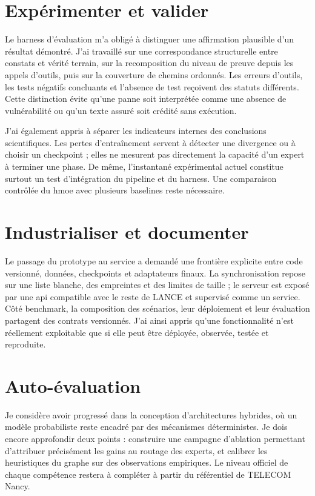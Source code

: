 \section{Expérimenter et valider}

Le harness d'évaluation m'a obligé à distinguer une affirmation plausible d'un
résultat démontré. J'ai travaillé sur une correspondance structurelle entre
constats et vérité terrain, sur la recomposition du niveau de preuve depuis les
appels d'outils, puis sur la couverture de chemins ordonnés. Les erreurs
d'outils, les tests négatifs concluants et l'absence de test reçoivent des
statuts différents. Cette distinction évite qu'une panne soit interprétée comme
une absence de vulnérabilité ou qu'un texte assuré soit crédité sans exécution.

J'ai également appris à séparer les indicateurs internes des conclusions
scientifiques. Les pertes d'entraînement servent à détecter une divergence ou à
choisir un checkpoint ; elles ne mesurent pas directement la capacité d'un
expert à terminer une phase. De même, l'instantané expérimental actuel constitue
surtout un test d'intégration du pipeline et du harness. Une comparaison
contrôlée du \gls{hmoe} avec plusieurs baselines reste nécessaire.

\section{Industrialiser et documenter}

Le passage du prototype au service a demandé une frontière explicite entre code
versionné, données, checkpoints et adaptateurs finaux. La synchronisation repose
sur une liste blanche, des empreintes et des limites de taille ; le serveur est
exposé par une \gls{api} compatible avec le reste de LANCE et supervisé comme un
service. Côté benchmark, la composition des scénarios, leur déploiement et leur
évaluation partagent des contrats versionnés. J'ai ainsi appris qu'une
fonctionnalité n'est réellement exploitable que si elle peut être déployée,
observée, testée et reproduite.

\section{Auto-évaluation}

Je considère avoir progressé dans la conception d'architectures hybrides, où un
modèle probabiliste reste encadré par des mécanismes déterministes. Je dois
encore approfondir deux points : construire une campagne d'ablation permettant
d'attribuer précisément les gains au routage des experts, et calibrer les
heuristiques du graphe sur des observations empiriques. Le niveau officiel de
chaque compétence restera à compléter à partir du référentiel de TELECOM Nancy.
